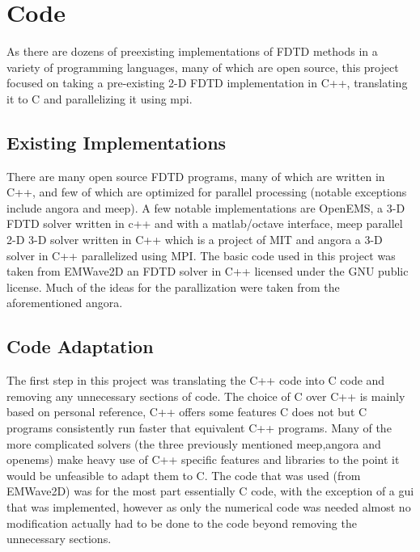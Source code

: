 \documentclass{article}
\begin{document}
\section{Code}%
As there are dozens of preexisting implementations of FDTD methods in a variety
of programming languages, many of which are open source, this project focused
on taking a pre-existing 2-D FDTD implementation in C++, translating it to C
and parallelizing it using mpi.
\subsection{Existing Implementations}
There are many open source FDTD programs, many of which are written in C++, and
few of which are optimized for parallel processing (notable exceptions include
angora and meep). A few notable implementations are OpenEMS, a 3-D FDTD solver
written in c++ and with a matlab/octave interface, meep parallel 2-D 3-D solver
written in C++ which is a project of MIT and angora a 3-D solver in C++
parallelized using MPI.  The basic code used in this project was taken from
EMWave2D an FDTD solver in C++ licensed under the GNU public license. Much of
the ideas for the parallization were taken from the aforementioned angora.
\subsection{Code Adaptation}
The first step in this project was translating the C++ code into C code and
removing any unnecessary sections of code. The choice of C over C++ is mainly
based on personal reference, C++ offers some features C does not but C
programs consistently run faster that equivalent C++ programs. Many of the more
complicated solvers (the three previously mentioned meep,angora and openems)
make heavy use of C++ specific features and libraries to the point it would be
unfeasible to adapt them to C. The code that was used (from EMWave2D) was for
the most part essentially C code, with the exception of a gui that was
implemented, however as only the numerical code was needed almost no
modification actually had to be done to the code beyond removing the unnecessary
sections.
\end{document}
